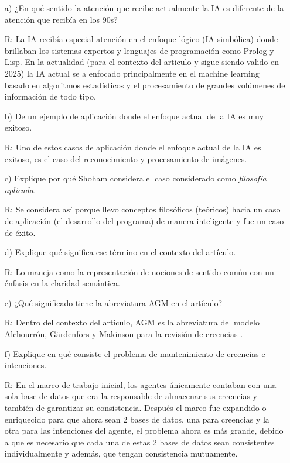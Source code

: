 \documentclass[11pt, letterpaper]{article}
\begin{document}
	\begin{enumerate}
		\item[a)] ¿En qué sentido la atención que recibe actualmente la IA es diferente de la atención que recibía en los 90s?
		
		R: La IA recibía especial atención en el enfoque lógico (IA simbólica) donde brillaban los sistemas expertos y lenguajes de programación como Prolog y Lisp. En la actualidad (para el contexto del articulo \cite{Shoham2015} y sigue siendo valido en 2025) la IA actual se a enfocado principalmente en el machine learning basado en algoritmos estadísticos y el procesamiento de grandes volúmenes de información de todo tipo.
		
		\item[b)] De un ejemplo de aplicación donde el enfoque actual de la IA es muy exitoso.
		
		R: Uno de estos casos de aplicación donde el enfoque actual de la IA es exitoso, es el caso del reconocimiento y procesamiento de imágenes.
		
		
		\item[c)]  Explique por qué Shoham considera el caso considerado como \textit{filosofía aplicada}.
		
		R: Se considera así porque llevo conceptos filosóficos (teóricos) hacia un caso de aplicación (el desarrollo del programa) de manera inteligente y fue un caso de éxito.
		
		\item[d)] Explique qué significa ese término en el contexto del artículo.
		
		R: Lo maneja como la representación de nociones de sentido común con un énfasis en la claridad semántica.
		
		\item[e)] ¿Qué significado tiene la abreviatura AGM en el artículo?
		
		R: Dentro del contexto del artículo, AGM es la abreviatura del modelo Alchourrón, Gärdenfors y Makinson para la revisión de creencias \cite{Huber2013}. 
		
		\newpage
		
		\item[f)]  Explique en qué consiste el problema de mantenimiento de creencias e intenciones.
		
		R: En el marco de trabajo inicial, los agentes únicamente contaban con una sola base de datos que era la responsable de almacenar sus creencias y también de garantizar su consistencia. Después el marco fue expandido o enriquecido para que ahora sean 2 bases de datos, una para creencias y la otra para las intenciones del agente, el problema ahora es más grande, debido a que es necesario que cada una de estas 2 bases de datos sean consistentes individualmente y además, que tengan consistencia mutuamente.
		

\end{enumerate}
\end{document}
